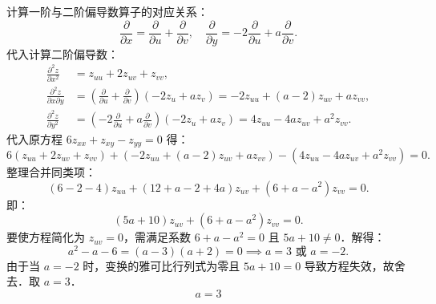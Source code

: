 \begin{solution}
    计算一阶与二阶偏导数算子的对应关系：
    \begin{equation}
        \frac{\partial}{\partial x} = \frac{\partial}{\partial u} + \frac{\partial}{\partial v}, \quad \frac{\partial}{\partial y} = -2\frac{\partial}{\partial u} + a\frac{\partial}{\partial v}.
    \end{equation}
    代入计算二阶偏导数：
    \begin{equation}
        \begin{aligned}
            \frac{\partial^2 z}{\partial x^2}          & = z_{uu} + 2z_{uv} + z_{vv},                                                                                                                 \\
            \frac{\partial^2 z}{\partial x \partial y} & = \left( \frac{\partial}{\partial u} + \frac{\partial}{\partial v} \right) \left( -2z_u + az_v \right) = -2z_{uu} + (a-2)z_{uv} + az_{vv},   \\
            \frac{\partial^2 z}{\partial y^2}          & = \left( -2\frac{\partial}{\partial u} + a\frac{\partial}{\partial v} \right) \left( -2z_u + az_v \right) = 4z_{uu} - 4az_{uv} + a^2 z_{vv}.
        \end{aligned}
    \end{equation}
    代入原方程 $6z_{xx} + z_{xy} - z_{yy} = 0$ 得：
    \begin{equation}
        6(z_{uu} + 2z_{uv} + z_{vv}) + (-2z_{uu} + (a-2)z_{uv} + az_{vv}) - (4z_{uu} - 4az_{uv} + a^2 z_{vv}) = 0.
    \end{equation}
    整理合并同类项：
    \begin{equation}
        (6 - 2 - 4)z_{uu} + (12 + a - 2 + 4a)z_{uv} + (6 + a - a^2)z_{vv} = 0.
    \end{equation}
    即：
    \begin{equation}
        (5a + 10)z_{uv} + (6 + a - a^2)z_{vv} = 0.
    \end{equation}
    要使方程简化为 $z_{uv} = 0$，需满足系数 $6 + a - a^2 = 0$ 且 $5a + 10 \neq 0$．解得：
    \begin{equation}
        a^2 - a - 6 = (a - 3)(a + 2) = 0 \implies a = 3 \text{ 或 } a = -2.
    \end{equation}
    由于当 $a = -2$ 时，变换的雅可比行列式为零且 $5a + 10 = 0$ 导致方程失效，故舍去．取 $a = 3$．
    \begin{equation}
        \boxed{a = 3}
    \end{equation}
\end{solution}


